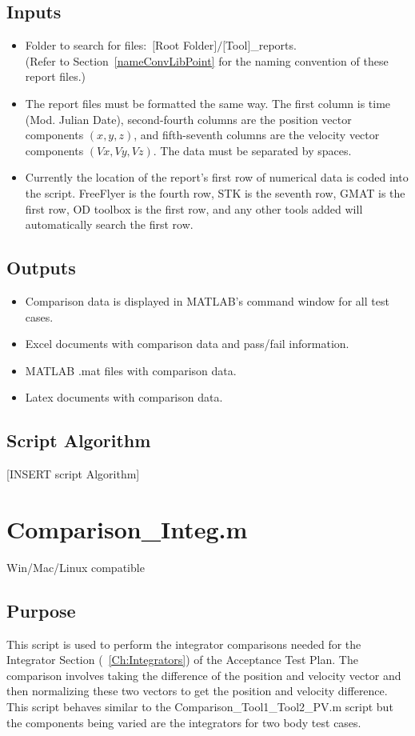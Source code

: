 \subsection{Inputs}
\begin{itemize}
    \item Folder to search for files$:$ $[$Root Folder$]/[$Tool$]$\_reports. \\
    (Refer to Section~\ref{nameConvLibPoint} for the naming convention
    of these report files.)
    \item The report files must be formatted the same way. The first
    column is time (Mod. Julian Date), second-fourth columns are the position vector
    components $(x,y,z)$, and fifth-seventh columns are the velocity
    vector components $(Vx,Vy,Vz)$. The data must be separated by
    spaces.
    \item Currently the location of the report's first row of numerical data is coded into the script.
    FreeFlyer is the fourth row, STK is the seventh row, GMAT is the
    first row, OD toolbox is the first row, and any other tools added
    will automatically search the first row.
\end{itemize}
\subsection{Outputs}
\begin{itemize}
    \item Comparison data is displayed in MATLAB's command window
    for all test cases.
    \item Excel documents with comparison data and pass/fail
    information.
    \item MATLAB .mat files with comparison data.
    \item Latex documents with comparison data.
\end{itemize}
\subsection{Script Algorithm}
[INSERT script Algorithm]

\section{Comparison\_Integ.m}
Win/Mac/Linux compatible
\subsection{Purpose}
This script is used to perform the integrator comparisons needed for
the Integrator Section (~\ref{Ch:Integrators}) of the Acceptance
Test Plan. The comparison involves taking the difference of the
position and velocity vector and then normalizing these two vectors
to get the position and velocity difference. This script behaves
similar to the Comparison\_Tool1\_Tool2\_PV.m script but the
components being varied are the integrators for two body test cases.
